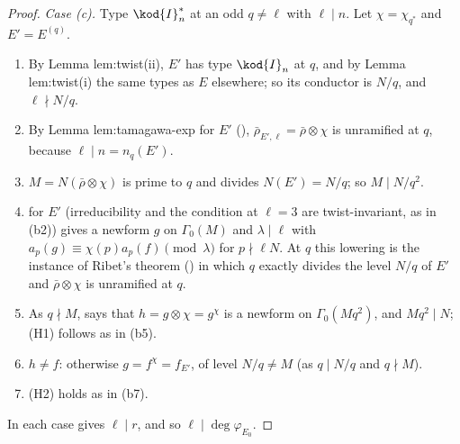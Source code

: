 \begin{proof}
\emph{Case (c).} Type $\kod{I}_n^*$ at an odd $q\ne\ell$ with $\ell\mid n$. Let $\chi=\chi_{q^*}$ and $E'=E^{(q)}$.
\begin{enumerate}[label=(c\arabic*)]
\item By Lemma lem:twist(ii), $E'$ has type $\kod{I}_n$ at $q$, and by Lemma lem:twist(i) the same types as $E$ elsewhere; so its conductor is $N/q$, and $\ell\nmid N/q$.
\item By Lemma lem:tamagawa-exp for $E'$ (), $\bar\rho_{E',\ell}=\bar\rho\otimes\chi$ is unramified at $q$, because $\ell\mid n=n_q(E')$.
\item $M=N(\bar\rho\otimes\chi)$ is prime to $q$ and divides $N(E')=N/q$; so $M\mid N/q^2$.
\item {} for $E'$ (irreducibility and the condition at $\ell=3$ are twist-invariant, as in (b2)) gives a newform $g$ on $\Gamma_0(M)$ and $\lambda\mid\ell$
with $a_p(g)\equiv\chi(p)a_p(f)\pmod\lambda$ for $p\nmid\ell N$. At $q$ this lowering is the instance of Ribet's theorem () in which $q$ exactly divides the
level $N/q$ of $E'$ and $\bar\rho\otimes\chi$ is unramified at $q$.
\item As $q\nmid M$,  says that $h=g\otimes\chi=g^\chi$ is a newform on $\Gamma_0(Mq^2)$, and $Mq^2\mid N$; (H1) follows as in (b5).
\item $h\ne f$: otherwise $g=f^\chi=f_{E'}$, of level $N/q\ne M$ (as $q\mid N/q$ and $q\nmid M$).
\item (H2) holds as in (b7).
\end{enumerate}
In each case  gives $\ell\mid r$, and so $\ell\mid\deg\varphi_{E_0}$.
\end{proof}


